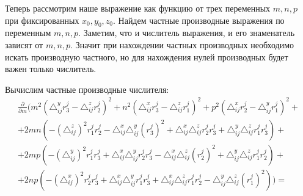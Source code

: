 
Теперь рассмотрим наше выражение как функцию от трех переменных $m, n, p$ при фиксированных $x_0, y_0, z_0$. Найдем частные производные выражения по переменным $m, n, p$. Заметим, что и числитель выражения, и его знаменатель зависят от $m,n,p$. Значит при нахождении частных производных необходимо искать производную частного, но для нахождения нулей производных будет важен только числитель.

Вычислим частные производные числителя:
$$\begin{gathered}
	\frac{\partial}{\partial m} \bigg( m^2 \left( \triangle_{ij}^y r_3^j - \triangle_{ij}^z r_2^j \right)^2 
	+ n^2 \left( \triangle_{ij}^x r_3^j - \triangle_{ij}^z r_1^j \right)^2
	+ p^2 \left( \triangle_{ij}^x r_2^j - \triangle_{ij}^y r_1^j \right)^2 + \\
	+ 2 m n \left( - \left( \triangle_{ij}^z \right)^2 r_1^j r_2^j - \triangle_{ij}^x \triangle_{ij}^y (r_3^j)^2 + \triangle_{ij}^x  \triangle_{ij}^z r_2^j r_3^j + \triangle_{ij}^y  \triangle_{ij}^z r_1^j r_3^j \right) + \\
	+ 2 m p \left( - \left( \triangle_{ij}^y\right)^2 r_1^j r_3^j +  \triangle_{ij}^x \triangle_{ij}^y r_2^j r_3^j -  \triangle_{ij}^x  \triangle_{ij}^z (r_2^j)^2 +  \triangle_{ij}^y  \triangle_{ij}^z r_1^j r_2^j \right) + \\
	+ 2 n p \left( - \left(\triangle_{ij}^x\right)^2 r_2^j r_3^j +  \triangle_{ij}^x \triangle_{ij}^y r_1^j r_3^j +  \triangle_{ij}^x  \triangle_{ij}^z r_1^j r_2^j -  \triangle_{ij}^y  \triangle_{ij}^z (r_1^j)^2 \right) \bigg) = 
\end{gathered}$$

